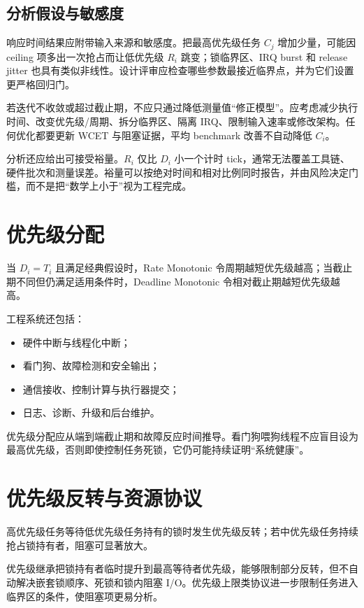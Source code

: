 \subsection{分析假设与敏感度}

响应时间结果应附带输入来源和敏感度。把最高优先级任务 $C_j$ 增加少量，可能因 ceiling 项多出一次抢占而让低优先级 $R_i$ 跳变；锁临界区、IRQ burst 和 release jitter 也具有类似非线性。设计评审应检查哪些参数最接近临界点，并为它们设置更严格回归门。

若迭代不收敛或超过截止期，不应只通过降低测量值“修正模型”。应考虑减少执行时间、改变优先级/周期、拆分临界区、隔离 IRQ、限制输入速率或修改架构。任何优化都要更新 WCET 与阻塞证据，平均 benchmark 改善不自动降低 $C_i$。

分析还应给出可接受裕量。$R_i$ 仅比 $D_i$ 小一个计时 tick，通常无法覆盖工具链、硬件批次和测量误差。裕量可以按绝对时间和相对比例同时报告，并由风险决定门槛，而不是把“数学上小于”视为工程完成。

\section{优先级分配}

当 $D_i=T_i$ 且满足经典假设时，Rate Monotonic 令周期越短优先级越高；当截止期不同但仍满足适用条件时，Deadline Monotonic 令相对截止期越短优先级越高。

工程系统还包括：
\begin{itemize}
  \item 硬件中断与线程化中断；
  \item 看门狗、故障检测和安全输出；
  \item 通信接收、控制计算与执行器提交；
  \item 日志、诊断、升级和后台维护。
\end{itemize}

优先级分配应从端到端截止期和故障反应时间推导。看门狗喂狗线程不应盲目设为最高优先级，否则即使控制任务死锁，它仍可能持续证明“系统健康”。

\section{优先级反转与资源协议}

高优先级任务等待低优先级任务持有的锁时发生优先级反转；若中优先级任务持续抢占锁持有者，阻塞可显著放大。

优先级继承把锁持有者临时提升到最高等待者优先级，能够限制部分反转，但不自动解决嵌套锁顺序、死锁和锁内阻塞 I/O。优先级上限类协议进一步限制任务进入临界区的条件，使阻塞项更易分析。

